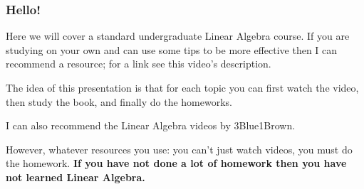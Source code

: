 \documentclass{checkin}
\begin{document}
\begin{frame}\frametitle{Hello!}
\begin{questions}
\pause
\item Here we will cover a standard undergraduate Linear Algebra course.
\pause
If you are studying on your own and can 
use some tips to be more effective then I can 
recommend a resource; for a link see this video's description.

\pause
\item The idea of this presentation is that for each
topic you can first watch the video,
then study the book, 
and finally do the homeworks.

\pause
\item I can also recommend the Linear Algebra videos by 3Blue1Brown.

\pause
\item However, whatever resources you use: you
can't just watch videos, you must do the homework.
\textbf{If you
have not done a lot of homework then you have not learned
Linear Algebra.}
\end{questions}
\end{frame}
\end{document}
